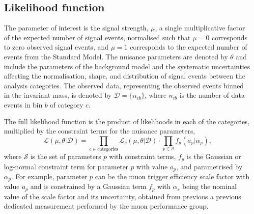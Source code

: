 \subsection{Likelihood function}

The parameter of interest is the signal strength, $\mu$, a single
multiplicative factor of the expected number of signal events,
normalised such that $\mu = 0$ corresponds to zero observed signal
events, and $\mu=1$ corresponds to the expected number of events
from the Standard Model.
The nuisance parameters are denoted by $\theta$ and include the 
parameters of the background model and the systematic
uncertainties affecting the normalisation, shape, and distribution
of signal events between the analysis categories. The observed data,
representing the observed events binned in the invariant mass, is
denoted by $\mathcal{D} = \{n_{cb}\}$, where $n_{cb}$ is the number of
data events in bin $b$ of category $c$.

The full likelihood function is the product of likelihoods
in each of the categories, multiplied by the constraint 
terms for the nuisance parameters,
\begin{equation}
\mathcal{L}(\mu, \theta | \mathcal{D}) =
\prod_{c \in \text{categories}} \mathcal{L}_c(\mu, \theta | \mathcal{D}) \cdot
\prod_{p \in \mathcal{S}} f_p (a_p | \alpha_p),
\end{equation}
where $\mathcal{S}$ is the set of parameters $p$ with constraint
terms, $f_p$ is the Gaussian or log-normal constraint term for parameter $p$
with value $a_p$, and parametrised by $\alpha_p$. For example, parameter
$p$ can be the muon trigger efficiency scale factor with
value $a_p$ and is constrained by a Gaussian term $f_p$ with
$\alpha_s$ being the nominal value of the scale factor and its uncertainty,
obtained from previous a previous dedicated measurement performed by the
muon performance group.

